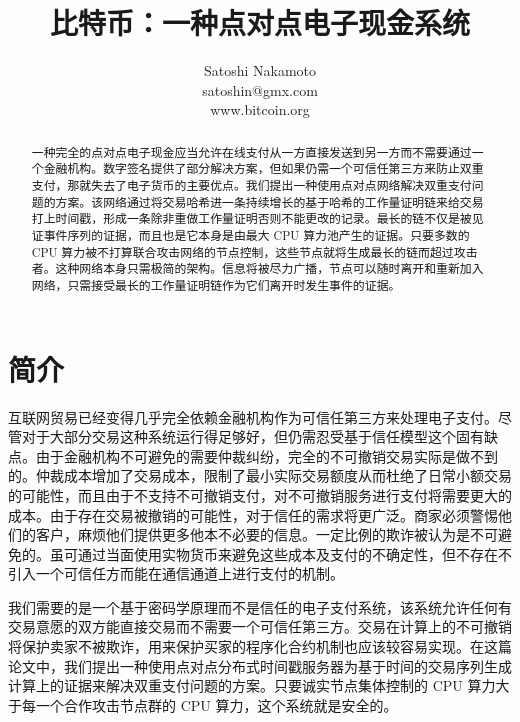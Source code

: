 \documentclass{article}
\begin{document}
\title{比特币：一种点对点电子现金系统}
\author{
 Satoshi Nakamoto\\
 satoshin@gmx.com\\
 www.bitcoin.org\\
}
\date{}

\maketitle

\begin{abstract}
 \noindent
 一种完全的点对点电子现金应当允许在线支付从一方直接发送到另一方而不需要通过一个金融机构。数字签名提供了部分解决方案，但如果仍需一个可信任第三方来防止双重支付，那就失去了电子货币的主要优点。我们提出一种使用点对点网络解决双重支付问题的方案。该网络通过将交易哈希进一条持续增长的基于哈希的工作量证明链来给交易打上时间戳，形成一条除非重做工作量证明否则不能更改的记录。最长的链不仅是被见证事件序列的证据，而且也是它本身是由最大 CPU 算力池产生的证据。只要多数的 CPU 算力被不打算联合攻击网络的节点控制，这些节点就将生成最长的链而超过攻击者。这种网络本身只需极简的架构。信息将被尽力广播，节点可以随时离开和重新加入网络，只需接受最长的工作量证明链作为它们离开时发生事件的证据。
\end{abstract}

\section{简介}
互联网贸易已经变得几乎完全依赖金融机构作为可信任第三方来处理电子支付。尽管对于大部分交易这种系统运行得足够好，但仍需忍受基于信任模型这个固有缺点。由于金融机构不可避免的需要仲裁纠纷，完全的不可撤销交易实际是做不到的。仲裁成本增加了交易成本，限制了最小实际交易额度从而杜绝了日常小额交易的可能性，而且由于不支持不可撤销支付，对不可撤销服务进行支付将需要更大的成本。由于存在交易被撤销的可能性，对于信任的需求将更广泛。商家必须警惕他们的客户，麻烦他们提供更多他本不必要的信息。一定比例的欺诈被认为是不可避免的。虽可通过当面使用实物货币来避免这些成本及支付的不确定性，但不存在不引入一个可信任方而能在通信通道上进行支付的机制。

我们需要的是一个基于密码学原理而不是信任的电子支付系统，该系统允许任何有交易意愿的双方能直接交易而不需要一个可信任第三方。交易在计算上的不可撤销将保护卖家不被欺诈，用来保护买家的程序化合约机制也应该较容易实现。在这篇论文中，我们提出一种使用点对点分布式时间戳服务器为基于时间的交易序列生成计算上的证据来解决双重支付问题的方案。只要诚实节点集体控制的 CPU 算力大于每一个合作攻击节点群的 CPU 算力，这个系统就是安全的。
\end{document}
